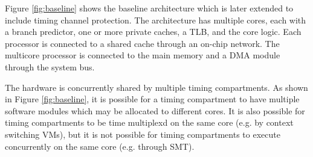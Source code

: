     Figure \ref{fig:baseline} shows the baseline architecture which is later 
    extended to include timing channel protection. The architecture has 
    multiple cores, each with a branch predictor, one or more private caches, a 
    TLB, and the core logic. Each processor is connected to a shared cache 
    through an on-chip network. The multicore processor is connected to the 
    main memory and a DMA module through the system bus. 

    The hardware is concurrently shared by multiple timing compartments. As 
    shown in Figure \ref{fig:baseline}, it is possible for a timing compartment 
    to have multiple software modules which may be allocated to different 
    cores. It is also possible for timing compartments to be time multiplexd on 
    the same core (e.g.  by context switching VMs), but it is not possible for 
    timing compartments to execute concurrently on the same core (e.g. through 
    SMT).

